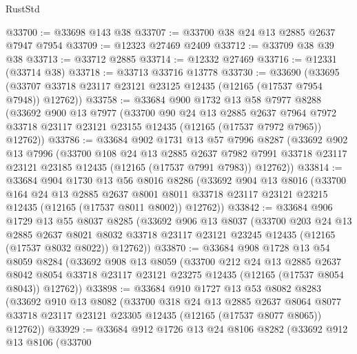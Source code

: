 \begin{lexlean}{RustStd}
\begin{coremodule}
@33700 := @33698 @143 @38
@33707 := @33700 @38 @24 @13 @2885 @2637 @7947 @7954
@33709 := @12323 @27469 @2409
@33712 := @33709 @38 @39 @38
@33713 := @33712 @2885
@33714 := @12332 @27469
@33716 := @12331 (@33714 @38)
@33718 := @33713 @33716 @13778
@33730 := @33690
    (@33695 (@33707 @33718 @23117 @23121 @23125 @12435 (@12165 (@17537 @7954 @7948)) @12762))
@33758 := @33684
    @900
    @1732
    @13
    @58
    @7977
    @8288
    (@33692
      @900
      @13
      @7977
      (@33700
        @90
        @24
        @13
        @2885
        @2637
        @7964
        @7972
        @33718
        @23117
        @23121
        @23155
        @12435
        (@12165 (@17537 @7972 @7965))
        @12762))
@33786 := @33684
    @902
    @1731
    @13
    @57
    @7996
    @8287
    (@33692
      @902
      @13
      @7996
      (@33700
        @108
        @24
        @13
        @2885
        @2637
        @7982
        @7991
        @33718
        @23117
        @23121
        @23185
        @12435
        (@12165 (@17537 @7991 @7983))
        @12762))
@33814 := @33684
    @904
    @1730
    @13
    @56
    @8016
    @8286
    (@33692
      @904
      @13
      @8016
      (@33700
        @164
        @24
        @13
        @2885
        @2637
        @8001
        @8011
        @33718
        @23117
        @23121
        @23215
        @12435
        (@12165 (@17537 @8011 @8002))
        @12762))
@33842 := @33684
    @906
    @1729
    @13
    @55
    @8037
    @8285
    (@33692
      @906
      @13
      @8037
      (@33700
        @203
        @24
        @13
        @2885
        @2637
        @8021
        @8032
        @33718
        @23117
        @23121
        @23245
        @12435
        (@12165 (@17537 @8032 @8022))
        @12762))
@33870 := @33684
    @908
    @1728
    @13
    @54
    @8059
    @8284
    (@33692
      @908
      @13
      @8059
      (@33700
        @212
        @24
        @13
        @2885
        @2637
        @8042
        @8054
        @33718
        @23117
        @23121
        @23275
        @12435
        (@12165 (@17537 @8054 @8043))
        @12762))
@33898 := @33684
    @910
    @1727
    @13
    @53
    @8082
    @8283
    (@33692
      @910
      @13
      @8082
      (@33700
        @318
        @24
        @13
        @2885
        @2637
        @8064
        @8077
        @33718
        @23117
        @23121
        @23305
        @12435
        (@12165 (@17537 @8077 @8065))
        @12762))
@33929 := @33684
    @912
    @1726
    @13
    @24
    @8106
    @8282
    (@33692
      @912
      @13
      @8106
      (@33700

\end{coremodule}
\end{lexlean}
